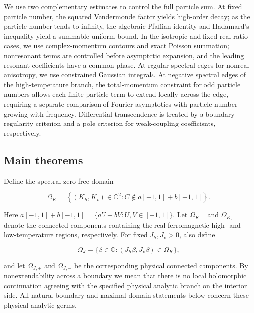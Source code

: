 \documentclass[11pt,a4paper]{article}
\numberwithin{equation}{section}
\theoremstyle{plain}
\theoremstyle{definition}
\begin{document}
We use two complementary estimates to control the full particle sum. At fixed particle number, the squared Vandermonde factor yields high-order decay; as the particle number tends to infinity, the algebraic Pfaffian identity and Hadamard's inequality yield a summable uniform bound. In the isotropic and fixed real-ratio cases, we use complex-momentum contours and exact Poisson summation; nonresonant terms are controlled before asymptotic expansion, and the leading resonant coefficients have a common phase. At regular spectral edges for nonreal anisotropy, we use constrained Gaussian integrals. At negative spectral edges of the high-temperature branch, the total-momentum constraint for odd particle numbers allows each finite-particle term to extend locally across the edge, requiring a separate comparison of Fourier asymptotics with particle number growing with frequency. Differential transcendence is treated by a boundary regularity criterion and a pole criterion for weak-coupling coefficients, respectively.

\subsection{Main theorems}\label{sec:main}

Define the spectral-zero-free domain

\begin{equation}
\Omega_K=\left\{(K_h,K_v)\in\mathbb C^2:C\notin a[-1,1]+b[-1,1]\right\}.
\label{eq:B2}
\end{equation}

Here \(a[-1,1]+b[-1,1]=\{aU+bV:U,V\in[-1,1]\}\). Let \(\Omega_{K,+}\) and \(\Omega_{K,-}\) denote the connected components containing the real ferromagnetic high- and low-temperature regions, respectively. For fixed \(J_h,J_v>0\), also define

\[\Omega_J=\{\beta\in\mathbb C:(J_h\beta,J_v\beta)\in\Omega_K\},\]

and let \(\Omega_{J,+}\) and \(\Omega_{J,-}\) be the corresponding physical connected components. By nonextendability across a boundary we mean that there is no local holomorphic continuation agreeing with the specified physical analytic branch on the interior side. All natural-boundary and maximal-domain statements below concern these physical analytic germs.
\end{document}
